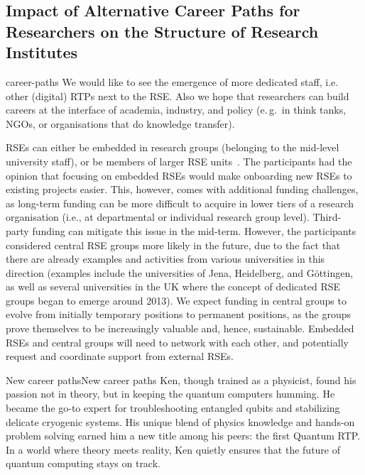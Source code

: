 \documentclass{eceasst}
\newcommand{\eg}{e.\,g.}
\begin{document}
\subsection{Impact of Alternative Career Paths for Researchers on the Structure of Research Institutes}
\begin{whatis}{}{career-paths}
We would like to see the emergence of more dedicated staff, i.e. other (digital) RTPs next to the RSE.
Also we hope that researchers can build careers at the interface of academia, industry, and policy (\eg\ in think tanks, NGOs,
or organisations that do knowledge transfer).
\end{whatis}
RSEs can either be embedded in research groups (belonging to the mid-level university staff),
or be members of larger RSE units~\cite{Kempf2025-draft}.
The participants had the opinion that focusing on embedded RSEs would make onboarding new RSEs to existing projects easier.
This, however, comes with additional funding challenges,
as long-term funding can be more difficult to acquire in lower tiers
of a research organisation (i.e., at departmental or individual research group level).
Third-party funding can mitigate this issue in the mid-term.
However, the participants considered central RSE groups more likely in the future,
due to the fact that there are already examples and activities from various universities in this direction
(examples include the universities of Jena, Heidelberg, and Göttingen, as well as several universities
in the UK where the concept of dedicated RSE groups began to emerge around 2013).
We expect funding in central groups to evolve from initially temporary positions to permanent positions,
as the groups prove themselves to be increasingly valuable and, hence, sustainable.
Embedded RSEs and central groups will need to network with each other,
and potentially request and coordinate support from external RSEs.

\begin{story}{New career paths}{New career paths}
Ken, though trained as a physicist, found his passion not in theory,
but in keeping the quantum computers humming. He became the go-to expert
for troubleshooting entangled qubits and stabilizing delicate cryogenic systems.
His unique blend of physics knowledge and hands-on problem solving earned him
a new title among his peers: the first Quantum RTP.
In a world where theory meets reality, Ken quietly ensures that the future
of quantum computing stays on track.
\end{story}
\end{document}
